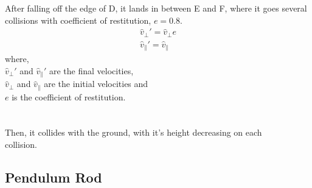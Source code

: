 \documentclass[11pt]{article}
\begin{document}
After falling off the edge of D, it lands in between E and F, where it goes several collisions with coefficient of restitution, $e = 0.8$. \cite{halliday}
\begin{align}
\hat{v}_{\perp} ' = \hat{v}_{\perp}e
\\
\hat{v}_{\parallel} ' = \hat{v}_{\parallel}
\end{align}
where,\\
$\hat{v}_{\perp} '$ and $\hat{v}_{\parallel} '$ are the final velocities,\\
$\hat{v}_{\perp}$ and $\hat{v}_{\parallel}$ are the initial velocities and\\
$e$ is the coefficient of restitution.
\\
\\
\setlength\fboxsep{2pt}
\setlength\fboxrule{1pt}
\\

Then, it collides with the ground, with it's height decreasing on each \\ collision.

\pagebreak

\subsection{Pendulum Rod}
\end{document}
